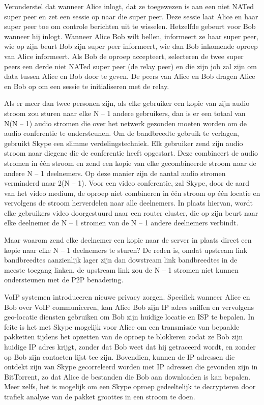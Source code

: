 \noindent Veronderstel dat wanneer Alice inlogt, dat ze toegewezen is aan een niet NATed super peer en zet een sessie op naar die super peer. Deze sessie laat Alice en haar super peer toe om controle berichten uit te wisselen. Hetzelfde gebeurt voor Bob wanneer hij inlogt. Wanneer Alice Bob wilt bellen, informeert ze haar super peer, wie op zijn beurt Bob zijn super peer informeert, wie dan Bob inkomende oproep van Alice informeert. Als Bob de oproep accepteert, selecteren de twee super peers een derde niet NATed super peer (de relay peer) en die zijn job zal zijn om data tussen Alice en Bob door te geven. De peers van Alice en Bob dragen Alice en Bob op om een sessie te initialiseren met de relay.

\noindent Als er meer dan twee personen zijn, als elke gebruiker een kopie van zijn audio stroom zou sturen naar elke N – 1 andere gebruikers, dan is er een totaal van N(N – 1) audio stromen die over het netwerk gezonden moeten worden om de audio conferentie te ondersteunen. Om de bandbreedte gebruik te verlagen, gebruikt Skype een slimme verdelingstechniek. Elk gebruiker zend zijn audio stroom naar diegene die de conferentie heeft opgestart. Deze combineert de audio stromen in één stroom en zend een kopie van elke gecombineerde stroom naar de andere N – 1 deelnemers. Op deze manier zijn de aantal audio stromen verminderd naar 2(N – 1).
Voor een video conferentie, zal Skype, door de aard van het video medium, de oproep niet combineren in één stroom op één locatie en vervolgens de stroom herverdelen naar alle deelnemers. In plaats hiervan, wordt elke gebruikers video doorgestuurd naar een router cluster, die op zijn beurt naar elke deelnemer de N – 1 stromen van de N – 1 andere deelnemers verbindt.

\newpage

\noindent Maar waarom zend elke deelnemer een kopie naar de server in plaats direct een kopie naar elke N – 1 deelnemers te sturen? De reden is, omdat upstream link bandbreedtes aanzienlijk lager zijn dan dowstream link bandbreedtes in de meeste toegang linken, de upstream link zou de N – 1 stromen niet kunnen ondersteunen met de P2P benadering.

\noindent VoIP systemen introduceren nieuwe privacy zorgen. Specifiek wanneer Alice en Bob over VoIP communiceren, kan Alice Bob zijn IP adres sniffen en vervolgens geo-locatie diensten gebruiken om Bob zijn huidige locatie  en ISP te bepalen. In feite is het met Skype mogelijk voor Alice om een transmissie van bepaalde pakketten tijdens het opzetten van de oproep te blokkeren zodat ze Bob zijn huidige IP adres krijgt, zonder dat Bob weet dat hij getraceerd wordt, en zonder op Bob zijn contacten lijst tee zijn. Bovendien, kunnen de IP adressen die ontdekt zijn van Skype gecorreleerd worden met IP adressen die gevonden zijn in BitTorrent, zo dat Alice de bestanden die Bob aan downloaden is kan bepalen. Meer zelfs, het is mogelijk om een Skype oproep gedeeltelijk te decrypteren door trafiek analyse van de pakket groottes in een stroom te doen.